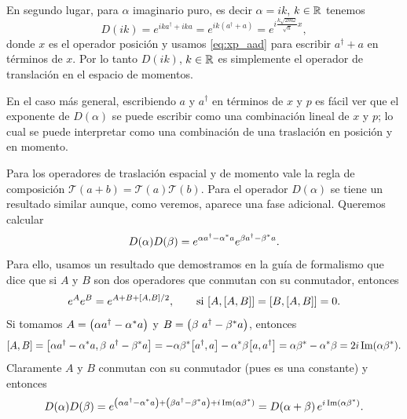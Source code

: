 \documentclass[10pt, a4paper]{article}
\numberwithin{equation}{subsection}
\begin{document}
En segundo lugar, para $\alpha$ imaginario puro, es decir $\alpha = ik$, $k \in
\mathbb{R}$ tenemos
\begin{equation}
  D(ik) = e^{ika^\dagger + ika} = e^{ik\left(a^\dagger + a\right)} =
    e^{i\frac{k\sqrt{2m\omega}}{\sqrt{\hbar}}x},
\end{equation}
donde $x$ es el operador posición y usamos \eqref{eq:xp_aad} para escribir
$a^\dagger + a$ en términos de $x$. Por lo tanto $D(ik)$, $k\in\mathbb{R}$ es
simplemente el operador de translación en el espacio de momentos.

En el caso más general, escribiendo $a$ y $a^\dagger$ en términos de $x$ y $p$
es fácil ver que el exponente de $D(\alpha)$ se puede escribir como una
combinación lineal de $x$ y $p$; lo cual se puede interpretar como una
combinación de una traslación en posición y en momento.

\bigbreak


\bigbreak

Para los operadores de traslación espacial y de momento vale la regla de
composición $\mathcal{T}(a + b) = \mathcal{T}(a)\mathcal{T}(b)$. Para el
operador $D(\alpha)$ se tiene un resultado similar aunque, como veremos,
aparece una fase adicional. Queremos calcular
\begin{equation}
  D(\alpha)D(\beta) = e^{\alpha a^\dagger - {{\alpha}^{*}}a} e^{\beta a^\dagger
    - {{\beta}^{*}}a}.
\end{equation}
Para ello, usamos un resultado que demostramos en la guía de formalismo que
dice que si $A$ y $B$ son dos operadores que conmutan con su conmutador,
entonces
\begin{equation} \label{eq:expsum_comm}
  e^{A}e^{B} = e^{A + B + \comm{A}{B}/2}, \qquad\text{si }\comm{A}{\comm{A}{B}}
    = \comm{B}{\comm{A}{B}} = 0.
\end{equation}
Si tomamos $A = \left(\alpha a^\dagger - {{\alpha}^{*}}a\right)$ y $B =
\left(\beta\ a^\dagger - {{\beta}^{*}}a\right)$, entonces
\begin{equation}
  \comm{A}{B} = \comm{\alpha a^\dagger - \conj{\alpha}a}
    {\beta\ a^\dagger - \conj{\beta}a} = -\alpha\conj{\beta}\comm{a^\dagger}{a}
    - \conj{\alpha}\beta\comm{a}{a^\dagger} = \alpha\conj{\beta} -
    \conj{\alpha}\beta = 2i\Im(\alpha\conj{\beta}).
\end{equation}
Claramente $A$ y $B$ conmutan con su conmutador (pues es una constante) y
entonces
\begin{equation}
  D(\alpha)D(\beta) = e^{\left(\alpha a^\dagger - {{\alpha}^{*}}a\right) +
    \left(\beta a^\dagger - {{\beta}^{*}}a\right) + i\Im(\alpha{{\beta}^{*}})}
    = D(\alpha + \beta)\,e^{i\Im(\alpha{{\beta}^{*}})}.
\end{equation}
\end{document}
